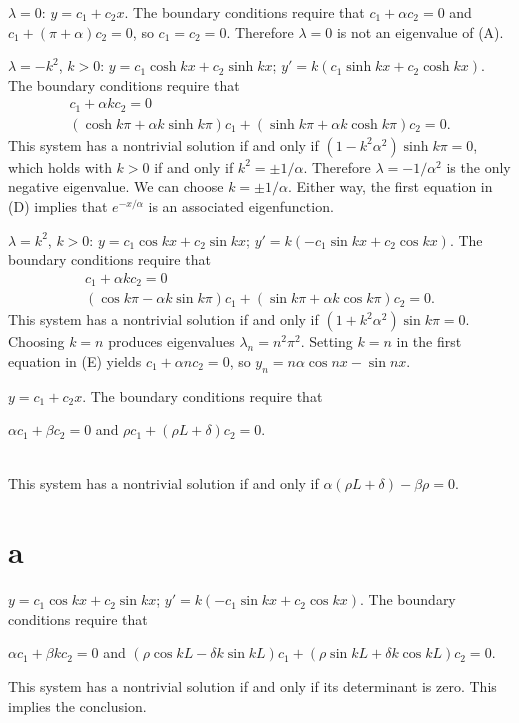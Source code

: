 \documentclass[dvips]{book}
\renewcommand{\exer}[1]{\par\medskip\;\noindent{\color{red}\bf #1.}}
\numberwithin{example}{section}
\numberwithin{equation}{section}
\numberwithin{theorem}{section}
\numberwithin{table}{section}
\numberwithin{figure}{section}
\begin{document}
\exer{13.2.26}
$\lambda=0$:
 $y=c_{1}+c_{2}x$. The boundary   conditions require that
$c_{1}+\alpha c_{2}=0$ and $c_{1}+(\pi+\alpha)c_{2}=0$, so $c_{1}=c_{2}=0$.
Therefore $\lambda=0$ is not an eigenvalue of (A).


$\lambda=-k^{2}$, $k>0$:
 $y=c_{1}\cosh kx+c_{2}\sinh kx$;
$y'=k(c_{1}\sinh kx+c_{2}\cosh kx)$. The boundary conditions  require
that
\begin{equation}\tag{D}
\begin{gathered}
c_{1}+\alpha kc_{2}=0\\
(\cosh k\pi+\alpha k\sinh k\pi)c_{1}+(\sinh k\pi+\alpha k\cosh
k\pi)c_{2}=0.
\end{gathered}
\end{equation}
This
 system has  a nontrivial solution if and only if
$(1-k^{2}\alpha^{2})\sinh k\pi=0$, which holds with $k>0$ if and only if
$k^{2}=\pm 1/\alpha$. Therefore $\lambda=-1/\alpha^{2}$ is the only
negative eigenvalue. We can choose $k=\pm1/\alpha$. Either way, the first
equation in (D) implies that $e^{-x/\alpha}$ is an associated
eigenfunction.


$\lambda=k^{2}$, $k>0$:
 $y=c_{1}\cos kx+c_{2}\sin kx$;
  $y'=k(-c_{1}\sin kx+c_{2}\cos kx)$. The boundary conditions  require
that
\begin{equation}\tag{E}
\begin{gathered}
c_{1}+\alpha kc_{2}=0\\
(\cos k\pi-\alpha k\sin k\pi)c_{1}+(\sin k\pi+\alpha k\cos k
\pi)c_{2}=0.
\end{gathered}
\end{equation}
This
 system has  a nontrivial solution if and only if
$(1+k^{2}\alpha^{2})\sin k\pi=0$. Choosing $k=n$  produces eigenvalues
$\lambda_{n}=n^{2}\pi^{2}$. Setting  $k=n$ in the first equation in
(E) yields $c_{1}+\alpha nc_{2}=0$, so
$y_{n}=n\alpha\cos nx-\sin nx$.



\exer{13.2.28}
 $y=c_{1}+c_{2}x$. The boundary conditions require that\\
\centerline{$\alpha c_{1}+\beta c_{2}=0$ \;
and \; $\rho c_{1}+(\rho L+\delta)c_{2}=0$.}\\
 This system  has a nontrivial solution if and only if $\alpha(\rho L+\delta)-\beta\rho=0$.




\exer{13.2.30}
\part{a}
 $y=c_{1}\cos kx+c_{2}\sin kx$;
 $y'=k(-c_{1}\sin kx+c_{2}\cos kx)$. The boundary conditions  require
that  \\
\centerline{$\alpha c_{1}+\beta kc_{2}=0$ \; and \;
$(\rho\cos kL-\delta k\sin kL)c_{1}+(\rho\sin kL+\delta k\cos kL)c_{2}=0$.}
\noindent
This system has a nontrivial solution if and only if its determinant
is zero. This implies the conclusion.
\end{document}
